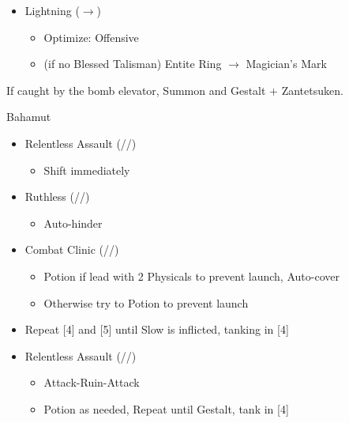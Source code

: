 \begin{multicols}{2}
\begin{menu}
\begin{itemize}
\begin{itemize}
\begin{itemize}
              \end{itemize}
        \item Lightning ($\rightarrow$)
              \begin{itemize}
                \item Optimize: Offensive
                \item (if no Blessed Talisman) Entite Ring $\rightarrow$ Magician's Mark
              \end{itemize}
      \end{itemize}
    \end{itemize}
  \end{menu}
  If caught by the bomb elevator, Summon and Gestalt + Zantetsuken.
  \renewcommand{\first}{[1] Relentless Assault (\com/\rav/\rav)}
  \renewcommand{\fifth}{[5] Ruthless (\sab/\com/\rav)
    \renewcommand{\fourth}{[4] Combat Clinic (\sen/\med/\med)}}
  \begin{battle}[0:42]{Bahamut}
    \begin{itemize}
      \item \first
            \begin{itemize}
              \item Shift immediately
            \end{itemize}
      \item \fifth
            \begin{itemize}
              \item Auto-hinder
            \end{itemize}
      \item \fourth
            \begin{itemize}
              \item Potion if lead with 2 Physicals to prevent launch, Auto-cover
              \item Otherwise try to Potion to prevent launch
            \end{itemize}
      \item Repeat [4] and [5] until Slow is inflicted, tanking in [4]
      \item \first
            \begin{itemize}
              \item Attack-Ruin-Attack
              \item Potion as needed, Repeat until Gestalt, tank in [4]
            \end{itemize}
    \end{itemize}
  \end{battle}
\end{multicols}
